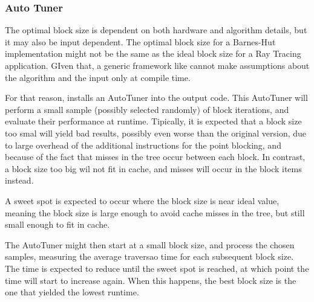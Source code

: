 \subsubsection{Auto Tuner}
\label{sec:optim:tuner}
The optimal block size is dependent on both hardware and algorithm details, but it may also be input dependent. The optimal block size for a Barnes-Hut implementation might not be the same as the ideal block size for a Ray Tracing application. GIven that, a generic framework like \treetiler cannot make assumptions about the algorithm and the input only at compile time.

For that reason, \treetiler installs an AutoTuner into the output code. This AutoTuner will perform a small sample (possibly selected randomly) of block iterations, and evaluate their performance at runtime.
Tipically, it is expected that a block size too smal will yield bad results, possibly even worse than the original version, due to large overhead of the additional instructions for the point blocking, and because of the fact that misses in the tree occur between each block. In contrast, a block size too big wil not fit in cache, and misses will occur in the block items instead.

A sweet spot is expected to occur where the block size is near ideal value, meaning the block size is large enough to avoid cache misses in the tree, but still small enough to fit in cache.

The AutoTuner might then start at a small block size, and process the chosen samples, measuring the average traversao time for each subsequent block size. The time is expected to reduce until the sweet spot is reached, at which point the time will start to increase again. When this happens, the best block size is the one that yielded the lowest runtime.